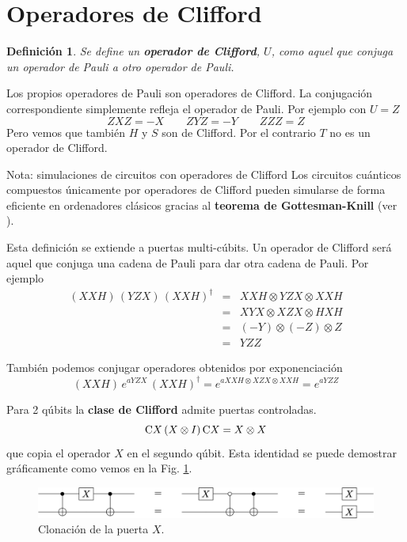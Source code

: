 \documentclass[a4paper,11pt]{book} %
\newtheorem{definicion_contador}{Definición}
\newcommand{\Definicion}[1]{
		\begin{mybox_gray2}{}
			\begin{definicion_contador}
				 #1 
			\end{definicion_contador} 
		\end{mybox_gray2}
	}
\numberwithin{equation}{chapter}
\newcommand{\cg}[1]{{\rm C}#1}
\begin{document}
    \section{Operadores de Clifford}

	\Definicion{Se define un \textbf{operador de Clifford}, $U$, como aquel que conjuga un operador de Pauli a otro operador de Pauli.}
	
	Los propios operadores de Pauli son operadores de Clifford.  La conjugación correspondiente simplemente refleja el operador de Pauli. Por ejemplo con $U=Z$
	$$
	ZXZ = -X~~~~~~~~~ZYZ = -Y ~~~~~~~~~ZZZ = Z 
	$$
Pero vemos que también $H$ y $S$ son de Clifford. Por el contrario $T$ no es un operador de Clifford.

	\begin{mybox_blue}{Nota: simulaciones de circuitos con operadores de Clifford}
	Los circuitos cuánticos compuestos únicamente por operadores de Clifford pueden simularse de forma eficiente en ordenadores
	clásicos gracias al \textbf{teorema de Gottesman-Knill} (ver \cite{Gottesman-Knill}).
	\end{mybox_blue}

Esta definición se extiende a puertas multi-cúbits. Un operador de Clifford será aquel que conjuga una cadena de Pauli para dar otra cadena de Pauli. Por ejemplo
	\begin{eqnarray*}
	(XXH) \, (YZX) \,  (XXH)^\dagger &=& XXH \otimes YZX \otimes XXH \\ 
	&=& XYX \otimes  XZX \otimes HXH \\ 
	&=& (-Y)\otimes (-Z) \otimes Z \\ 
	&=& YZZ
	\end{eqnarray*}

También podemos conjugar operadores obtenidos por exponenciación
	$$
	(XXH) \, e^{aYZX} \,  (XXH)^\dagger =e^{a XXH \otimes XZX \otimes XXH} =  e^{a YZZ}
	$$

Para 2 qúbits la \textbf{clase de Clifford} admite puertas controladas.
$$
\cg{X} \, (X\otimes I)\,  \cg{X} = X \otimes X
$$
que copia el operador $X$ en el segundo qúbit. Esta identidad se puede demostrar gráficamente como vemos en la Fig. \ref{Fig_elementos_clone_X}.
	\begin{figure}[H]
	\centering 
	\includegraphics[width=0.9\linewidth]{Figuras/Fig_elementos_clone_X}
	\caption{Clonación de la puerta $X$.}
	\label{Fig_elementos_clone_X}
	\end{figure}
\end{document}
